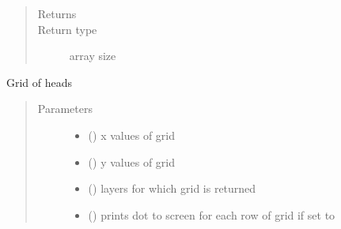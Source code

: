 \documentclass[letterpaper,10pt,english]{sphinxmanual}
\begin{document}
\begin{fulllineitems}
\begin{fulllineitems}
\begin{quote}
\begin{description}
\item[{Returns}] \leavevmode
{}

\item[{Return type}] \leavevmode
array size 

\end{description}\end{quote}




{\hyperref[\detokenize{models/model:timml.model.Model.headgrid2}]{}}



\end{fulllineitems}


\begin{fulllineitems}
\label{\detokenize{models/modelmaq:timml.model.ModelMaq.headgrid2}}
Grid of heads
\begin{quote}\begin{description}
\item[{Parameters}] \leavevmode\begin{itemize}
\item {} 
\sphinxstyleliteralstrong{, } (\sphinxstyleliteralemphasis{,}) \textendash{} x values of grid

\item {} 
\sphinxstyleliteralstrong{, } (\sphinxstyleliteralemphasis{,}) \textendash{} y values of grid

\item {} 
 (\sphinxstyleliteralemphasis{, }\sphinxstyleliteralemphasis{, }) \textendash{} layers for which grid is returned

\item {} 
 (\sphinxstyleliteralemphasis{, }) \textendash{} prints dot to screen for each row of grid if set to 


\end{itemize}
\end{description}
\end{quote}
\end{fulllineitems}
\end{fulllineitems}
\end{document}
